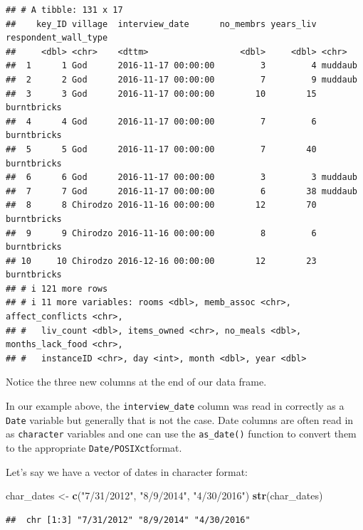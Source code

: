 \documentclass[
]{article}
\newenvironment{Shaded}{\begin{snugshade}}{\end{snugshade}}
\newcommand{\FunctionTok}[1]{\textcolor[rgb]{0.13,0.29,0.53}{\textbf{#1}}}
\newcommand{\NormalTok}[1]{#1}
\newcommand{\OtherTok}[1]{\textcolor[rgb]{0.56,0.35,0.01}{#1}}
\newcommand{\StringTok}[1]{\textcolor[rgb]{0.31,0.60,0.02}{#1}}
\begin{document}
\begin{verbatim}
## # A tibble: 131 x 17
##    key_ID village  interview_date      no_membrs years_liv respondent_wall_type
##     <dbl> <chr>    <dttm>                  <dbl>     <dbl> <chr>               
##  1      1 God      2016-11-17 00:00:00         3         4 muddaub             
##  2      2 God      2016-11-17 00:00:00         7         9 muddaub             
##  3      3 God      2016-11-17 00:00:00        10        15 burntbricks         
##  4      4 God      2016-11-17 00:00:00         7         6 burntbricks         
##  5      5 God      2016-11-17 00:00:00         7        40 burntbricks         
##  6      6 God      2016-11-17 00:00:00         3         3 muddaub             
##  7      7 God      2016-11-17 00:00:00         6        38 muddaub             
##  8      8 Chirodzo 2016-11-16 00:00:00        12        70 burntbricks         
##  9      9 Chirodzo 2016-11-16 00:00:00         8         6 burntbricks         
## 10     10 Chirodzo 2016-12-16 00:00:00        12        23 burntbricks         
## # i 121 more rows
## # i 11 more variables: rooms <dbl>, memb_assoc <chr>, affect_conflicts <chr>,
## #   liv_count <dbl>, items_owned <chr>, no_meals <dbl>, months_lack_food <chr>,
## #   instanceID <chr>, day <int>, month <dbl>, year <dbl>
\end{verbatim}

Notice the three new columns at the end of our data frame.

In our example above, the \texttt{interview\_date} column was read in
correctly as a \texttt{Date} variable but generally that is not the
case. Date columns are often read in as \texttt{character} variables and
one can use the \texttt{as\_date()} function to convert them to the
appropriate \texttt{Date/POSIXct}format.

Let's say we have a vector of dates in character format:

\begin{Shaded}
\begin{Highlighting}[]
\NormalTok{char\_dates }\OtherTok{\textless{}{-}} \FunctionTok{c}\NormalTok{(}\StringTok{"7/31/2012"}\NormalTok{, }\StringTok{"8/9/2014"}\NormalTok{, }\StringTok{"4/30/2016"}\NormalTok{)}
\FunctionTok{str}\NormalTok{(char\_dates)}
\end{Highlighting}
\end{Shaded}

\begin{verbatim}
##  chr [1:3] "7/31/2012" "8/9/2014" "4/30/2016"
\end{verbatim}
\end{document}
